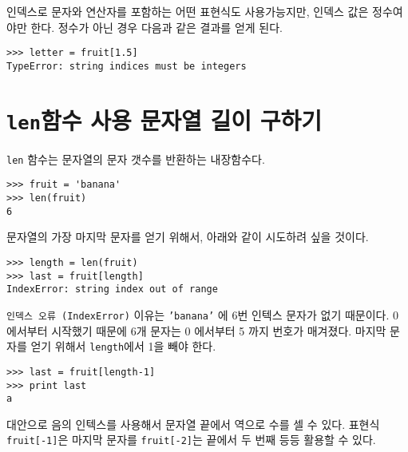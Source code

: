 
인덱스로 문자와 연산자를 포함하는 어떤 표현식도 사용가능지만, 인덱스 값은 정수여야만 한다.
정수가 아닌 경우 다음과 같은 결과를 얻게 된다.


\beforeverb
\begin{verbatim}
>>> letter = fruit[1.5]
TypeError: string indices must be integers
\end{verbatim}
\afterverb
%

\section{    {\tt len}함수 사용 문자열 길이 구하기}


{\tt len} 함수는 문자열의 문자 갯수를 반환하는 내장함수다.

\beforeverb
\begin{verbatim}
>>> fruit = 'banana'
>>> len(fruit)
6
\end{verbatim}
\afterverb
%

문자열의 가장 마지막 문자를 얻기 위해서, 아래와 같이 시도하려 싶을 것이다.


\beforeverb
\begin{verbatim}
>>> length = len(fruit)
>>> last = fruit[length]
IndexError: string index out of range
\end{verbatim}
\afterverb
%

{\tt 인덱스 오류 (IndexError)} 이유는 {\tt 'banana'} 에 6번 인텍스 문자가 없기 때문이다.
0 에서부터 시작했기 때문에 6개 문자는 0 에서부터 5 까지 번호가 매겨졌다. 
마지막 문자를 얻기 위해서 {\tt length}에서 1을 빼야 한다.

\beforeverb
\begin{verbatim}
>>> last = fruit[length-1]
>>> print last
a
\end{verbatim}
\afterverb
%

대안으로 음의 인텍스를 사용해서 문자열 끝에서 역으로 수를 셀 수 있다.
표현식 {\tt fruit[-1]}은 마지막 문자를 {\tt fruit[-2]}는 끝에서 두 번째 등등 활용할 수 있다.


